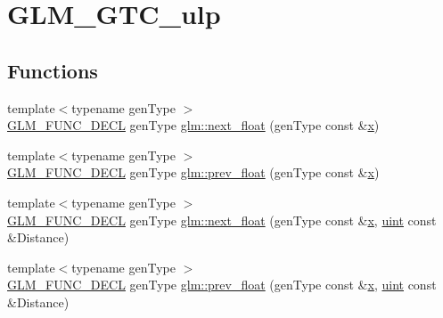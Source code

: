 \hypertarget{group__gtc__ulp}{}\section{G\+L\+M\+\_\+\+G\+T\+C\+\_\+ulp}
\label{group__gtc__ulp}
\subsection*{Functions}
\begin{DoxyCompactItemize}
\item 
{\footnotesize template$<$typename gen\+Type $>$ }\\\mbox{\hyperlink{setup_8hpp_ab2d052de21a70539923e9bcbf6e83a51}{G\+L\+M\+\_\+\+F\+U\+N\+C\+\_\+\+D\+E\+CL}} gen\+Type \mbox{\hyperlink{group__gtc__ulp_gae516ae554faa6117660828240e8bdaf0}{glm\+::next\+\_\+float}} (gen\+Type const \&\mbox{\hyperlink{_s_d_l__opengl_8h_ad0e63d0edcdbd3d79554076bf309fd47}{x}})
\item 
{\footnotesize template$<$typename gen\+Type $>$ }\\\mbox{\hyperlink{setup_8hpp_ab2d052de21a70539923e9bcbf6e83a51}{G\+L\+M\+\_\+\+F\+U\+N\+C\+\_\+\+D\+E\+CL}} gen\+Type \mbox{\hyperlink{group__gtc__ulp_ga2fcbb7bfbfc595712bfddc51b0715b07}{glm\+::prev\+\_\+float}} (gen\+Type const \&\mbox{\hyperlink{_s_d_l__opengl_8h_ad0e63d0edcdbd3d79554076bf309fd47}{x}})
\item 
{\footnotesize template$<$typename gen\+Type $>$ }\\\mbox{\hyperlink{setup_8hpp_ab2d052de21a70539923e9bcbf6e83a51}{G\+L\+M\+\_\+\+F\+U\+N\+C\+\_\+\+D\+E\+CL}} gen\+Type \mbox{\hyperlink{group__gtc__ulp_gad107ec3d9697ef82032a33338a73ebdd}{glm\+::next\+\_\+float}} (gen\+Type const \&\mbox{\hyperlink{_s_d_l__opengl_8h_ad0e63d0edcdbd3d79554076bf309fd47}{x}}, \mbox{\hyperlink{group__core__precision_ga4fd29415871152bfb5abd588334147c8}{uint}} const \&Distance)
\item 
{\footnotesize template$<$typename gen\+Type $>$ }\\\mbox{\hyperlink{setup_8hpp_ab2d052de21a70539923e9bcbf6e83a51}{G\+L\+M\+\_\+\+F\+U\+N\+C\+\_\+\+D\+E\+CL}} gen\+Type \mbox{\hyperlink{group__gtc__ulp_gaa399d5b6472a70e8952f9b26ecaacdec}{glm\+::prev\+\_\+float}} (gen\+Type const \&\mbox{\hyperlink{_s_d_l__opengl_8h_ad0e63d0edcdbd3d79554076bf309fd47}{x}}, \mbox{\hyperlink{group__core__precision_ga4fd29415871152bfb5abd588334147c8}{uint}} const \&Distance)
\item 

\end{DoxyCompactItemize}
